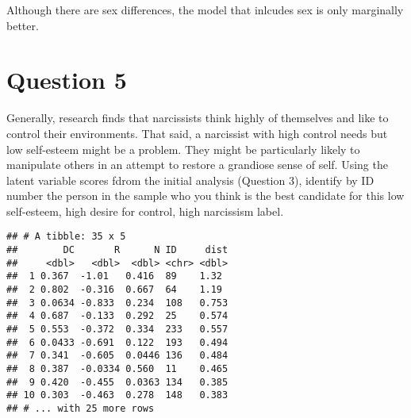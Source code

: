 \documentclass[]{article}
\newenvironment{Shaded}{\begin{snugshade}}{\end{snugshade}}
\newcommand{\KeywordTok}[1]{\textcolor[rgb]{0.13,0.29,0.53}{\textbf{#1}}}
\newcommand{\DataTypeTok}[1]{\textcolor[rgb]{0.13,0.29,0.53}{#1}}
\newcommand{\DecValTok}[1]{\textcolor[rgb]{0.00,0.00,0.81}{#1}}
\newcommand{\StringTok}[1]{\textcolor[rgb]{0.31,0.60,0.02}{#1}}
\newcommand{\OperatorTok}[1]{\textcolor[rgb]{0.81,0.36,0.00}{\textbf{#1}}}
\newcommand{\NormalTok}[1]{#1}
\begin{document}
Although there are sex differences, the model that inlcudes sex is only
marginally better.

\section{Question 5}\label{question-5}

Generally, research finds that narcissists think highly of themselves
and like to control their environments. That said, a narcissist with
high control needs but low self-esteem might be a problem. They might be
particularly likely to manipulate others in an attempt to restore a
grandiose sense of self. Using the latent variable scores fdrom the
initial analysis (Question 3), identify by ID number the person in the
sample who you think is the best candidate for this low self-esteem,
high desire for control, high narcissism label.

\begin{Shaded}
\end{Shaded}

\begin{verbatim}
## # A tibble: 35 x 5
##        DC       R      N ID     dist
##     <dbl>   <dbl>  <dbl> <chr> <dbl>
##  1 0.367  -1.01   0.416  89    1.32 
##  2 0.802  -0.316  0.667  64    1.19 
##  3 0.0634 -0.833  0.234  108   0.753
##  4 0.687  -0.133  0.292  25    0.574
##  5 0.553  -0.372  0.334  233   0.557
##  6 0.0433 -0.691  0.122  193   0.494
##  7 0.341  -0.605  0.0446 136   0.484
##  8 0.387  -0.0334 0.560  11    0.465
##  9 0.420  -0.455  0.0363 134   0.385
## 10 0.303  -0.463  0.278  148   0.383
## # ... with 25 more rows
\end{verbatim}
\end{document}
